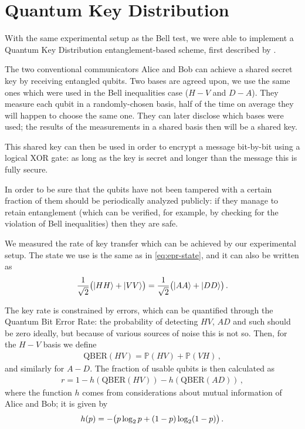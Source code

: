 \documentclass[main.tex]{subfiles}
\begin{document}
\section{Quantum Key Distribution}

With the same experimental setup as the Bell test, we were able to implement a Quantum Key Distribution entanglement-based scheme, first described by \textcite{bennettQuantumCryptographyBell1992}. 

The two conventional communicators Alice and Bob can achieve a shared secret key by receiving entangled qubits. 
Two bases are agreed upon, we use the same ones which were used in the Bell inequalities case (\(H-V\) and \(D-A\)).
They measure each qubit in a randomly-chosen basis, half of the time on average they will happen to choose the same one.
They can later disclose which bases were used; the results of the measurements in a shared basis then will be a shared key. 

This shared key can then be used in order to encrypt a message bit-by-bit using a logical XOR gate: as long as the key is secret and longer than the message this is fully secure.

In order to be sure that the qubits have not been tampered with a certain fraction of them should be periodically analyzed publicly: if they manage to retain entanglement (which can be verified, for example, by checking for the violation of Bell inequalities) then they are safe. 

We measured the rate of key transfer which can be achieved by our experimental setup. 
The state we use is the same as in \eqref{eq:epr-state}, and it can also be written as 
%
\begin{align}
\frac{1}{\sqrt{2}} \qty(\ket{HH} + \ket{VV})
=
\frac{1}{\sqrt{2}} \qty(\ket{AA} + \ket{DD})
\,.
\end{align}

The key rate is constrained by errors, which can be quantified through the Quantum Bit Error Rate: the probability of detecting \(HV\), \(AD\) and such should be zero ideally, but because of various sources of noise this is not so.
Then, for the \(H-V\) basis we define 
%
\begin{align}
\text{QBER}(HV) = \mathbb{P}(HV)+ \mathbb{P}(VH)
\,,
\end{align}
%
and similarly for \(A-D\). 
The fraction of usable qubits is then calculated as 
%
\begin{align}
r = 
1
- h (\text{QBER}(HV))
- h (\text{QBER}(AD))
\,,
\end{align}
%
where the function \(h\) comes from considerations about mutual information of Alice and Bob; it is given by 
%
\begin{align}
h (p) = - \qty(p \log_2 p + (1-p) \log_2 (1-p) )
\,.
\end{align}
\end{document}
